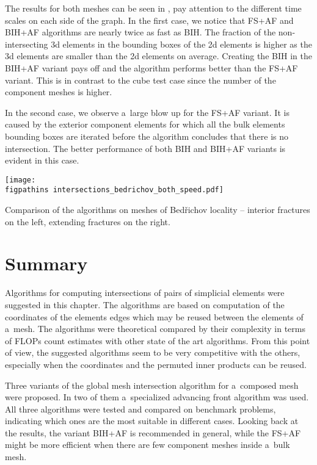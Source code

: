 The results for both meshes can be seen in , pay attention to the different time
scales on each side of the graph. In the first case, we notice that FS+AF and BIH+AF algorithms are nearly twice as fast as BIH.
The fraction of the non-intersecting 3d elements in the bounding boxes of the 2d elements is higher as the 3d elements are smaller than the 2d elements
on average.
Creating the BIH in the BIH+AF variant pays off and the algorithm performs better than the FS+AF variant.
This is in contrast to the cube test case since the number of the component meshes is higher.

In the second case, we observe a~large blow up for the FS+AF variant. It is caused by the exterior component elements
for which all the bulk elements bounding boxes are iterated before the algorithm concludes that there is no intersection.
The better performance of both BIH and BIH+AF variants is evident in this case.


\begin{graph}[!htb]
    \centering
    \texttt{[image: \\figpathins intersections\_bedrichov\_both\_speed.pdf]}
    \caption[Comparison of the algorithms on meshes of Bed{\v r}ichov locality.]
    {Comparison of the algorithms on meshes of Bed{\v r}ichov locality -- 
        interior fractures on the left,
        extending fractures on the right.}
    \label{graph:bedrichov_speed}
\end{graph}



\section{Summary}
Algorithms for computing intersections of pairs of simplicial elements were suggested in this chapter.
The algorithms are based on computation of the \plucker coordinates of the elements edges
which may be reused between the elements of a~mesh. The algorithms were theoretical compared
by their complexity in terms of FLOPs count estimates with other state of the art algorithms.
From this point of view, the suggested algorithms seem to be very competitive with the others,
especially when the \plucker coordinates and the permuted inner products can be reused.

Three variants of the global mesh intersection algorithm for a~composed mesh were proposed.
In two of them a~specialized advancing front algorithm was used.
All three algorithms were tested and compared on benchmark problems, indicating
which ones are the most suitable in different cases.
Looking back at the results, the variant BIH+AF is recommended in general,
while the FS+AF might be more efficient when there are few component meshes inside a~bulk mesh.

